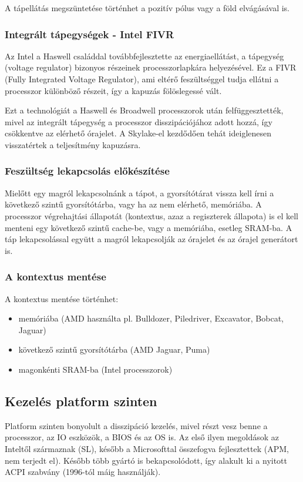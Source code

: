A tápellátás megszüntetése történhet a pozitív pólus vagy a föld elvágásával is.

\subsubsection{Integrált tápegységek - Intel FIVR}
Az Intel a Haswell családdal továbbfejlesztette az energiaellátást, a tápegység (voltage regulator) bizonyos részeinek processzorlapkára helyezésével.
Ez a FIVR (Fully Integrated Voltage Regulator), ami eltérő feszültséggel tudja ellátni a processzor különböző részeit, így a kapuzás fölöslegessé vált.

Ezt a technológiát a Haswell és Broadwell processzorok után felfüggesztették, mivel az integrált tápegység a processzor disszipációjához adott hozzá, így csökkentve az elérhető órajelet.
A Skylake-el kezdődően tehát ideiglenesen visszatértek a teljesítmény kapuzásra.

\subsubsection{Feszültség lekapcsolás előkészítése}
Mielőtt egy magról lekapcsolnánk a tápot, a gyorsítótárat vissza kell írni a következő szintű gyorsítótárba, vagy ha az nem elérhető, memóriába.
A processzor végrehajtási állapotát (kontextus, azaz a regiszterek állapota) is el kell menteni egy következő szintű cache-be, vagy a memóriába, esetleg SRAM-ba.
A táp lekapcsolással együtt a magról lekapcsolják az órajelet és az órajel generátort is.

\subsubsection{A kontextus mentése}
A kontextus mentése történhet:
\begin{itemize}
    \item memóriába (AMD használta pl. Bulldozer, Piledriver, Excavator, Bobcat, Jaguar)
    \item következő szintű gyorsítótárba (AMD Jaguar, Puma)
    \item magonkénti SRAM-ba (Intel processzorok)
\end{itemize}

\subsection{Kezelés platform szinten}
Platform szinten bonyolult a disszipáció kezelés, mivel részt vesz benne a processzor, az IO eszközök, a BIOS és az OS is.
Az első ilyen megoldások az Inteltől származnak (SL), később a Microsofttal összefogva fejlesztettek (APM, nem terjedt el).
Később több gyártó is bekapcsolódott, így alakult ki a nyitott ACPI szabvány (1996-tól máig használják).

